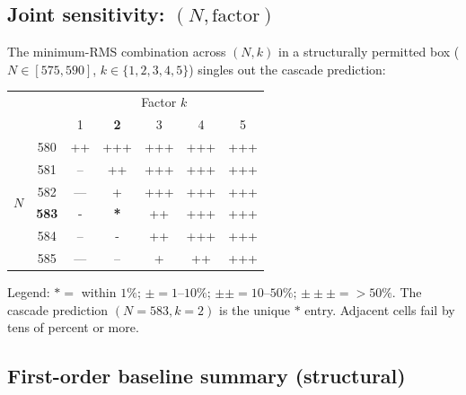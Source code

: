 \documentclass[11pt]{article}
\theoremstyle{plain}
\theoremstyle{definition}
\theoremstyle{remark}
\begin{document}
\subsection{Joint sensitivity: $(N, \text{factor})$}\label{app:joint-sensitivity}

The minimum-RMS combination across $(N, k)$ in a structurally permitted box ($N \in [575, 590]$, $k \in \{1, 2, 3, 4, 5\}$) singles out the cascade prediction:
\begin{center}
\begin{tabular}{cc|ccccc}
\toprule
& & \multicolumn{5}{c}{Factor $k$} \\
& & 1 & \textbf{2} & 3 & 4 & 5 \\
\midrule
\multirow{6}{*}{$N$} & 580 & ++ & +++ & +++ & +++ & +++ \\
 & 581 & -- & ++ & +++ & +++ & +++ \\
 & 582 & --- & + & +++ & +++ & +++ \\
 & \textbf{583} & - & \textbf{*} & ++ & +++ & +++ \\
 & 584 & -- & - & ++ & +++ & +++ \\
 & 585 & --- & -- & + & ++ & +++ \\
\bottomrule
\end{tabular}
\end{center}
Legend: $* = $ within $1\%$; $\pm = 1$--$10\%$; $\pm\pm = 10$--$50\%$; $\pm\pm\pm = > 50\%$. The cascade prediction $(N=583, k=2)$ is the unique $*$ entry. Adjacent cells fail by tens of percent or more.

\subsection{First-order baseline summary (structural)}\label{app:summary-predictions}
\end{document}
